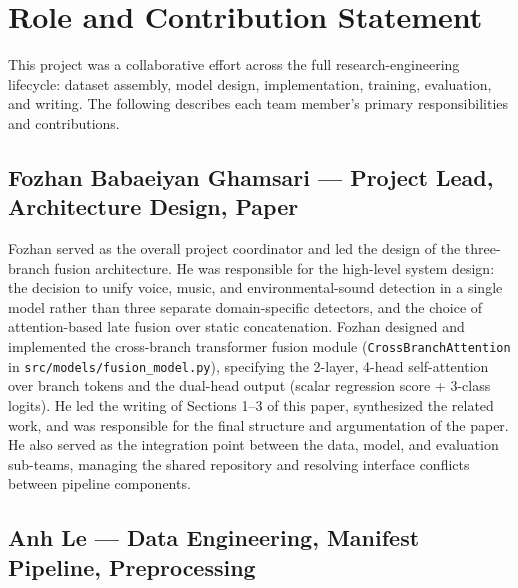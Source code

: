 \documentclass[10pt,twocolumn,a4paper]{article}
\begin{document}



\newpage
\onecolumn
\section*{Role and Contribution Statement}
\label{sec:roles}

This project was a collaborative effort across the full research-engineering lifecycle: dataset assembly, model design, implementation, training, evaluation, and writing. The following describes each team member's primary responsibilities and contributions.

\subsection*{Fozhan Babaeiyan Ghamsari --- Project Lead, Architecture Design, Paper}

Fozhan served as the overall project coordinator and led the design of the three-branch fusion architecture. He was responsible for the high-level system design: the decision to unify voice, music, and environmental-sound detection in a single model rather than three separate domain-specific detectors, and the choice of attention-based late fusion over static concatenation. Fozhan designed and implemented the cross-branch transformer fusion module (\texttt{CrossBranchAttention} in \texttt{src/models/fusion\_model.py}), specifying the 2-layer, 4-head self-attention over branch tokens and the dual-head output (scalar regression score + 3-class logits). He led the writing of Sections 1--3 of this paper, synthesized the related work, and was responsible for the final structure and argumentation of the paper. He also served as the integration point between the data, model, and evaluation sub-teams, managing the shared repository and resolving interface conflicts between pipeline components.

\subsection*{Anh Le --- Data Engineering, Manifest Pipeline, Preprocessing}
\end{document}
